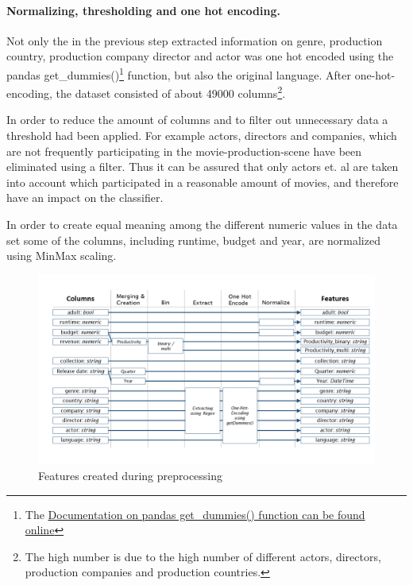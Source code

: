 \paragraph{Normalizing, thresholding and one hot encoding.}
Not only the in the previous step extracted information on genre, production country, production company director and actor was one hot encoded using the pandas get\_dummies()\footnote{The \hyperref{https://pandas.pydata.org/pandas-docs/stable/generated/pandas.get_dummies.html}{documentation}{pd.getDumies}{Documentation on pandas get\_dummies() function can be found online}} function, but also the original language. After one-hot-encoding, the dataset consisted of about 49000 columns\footnote{The high number is due to the high number of different actors, directors, production companies and production countries.}.

In order to reduce the amount of columns and to filter out unnecessary data a threshold had been applied. For example actors, directors and companies, which are not frequently participating in the movie-production-scene have been eliminated using a filter. Thus it can be assured that only actors et. al are taken into account which participated in a reasonable amount of movies, and therefore have an impact on the classifier.

In order to create equal meaning among the different numeric values in the data set some of the columns, including runtime, budget and year, are normalized using MinMax scaling.

\begin{figure}[htbp]
	\includegraphics[width=\textwidth]{images/3_features.png}
	\caption{Features created during preprocessing}
	\label{img:features}
\end{figure}
\FloatBarrier

